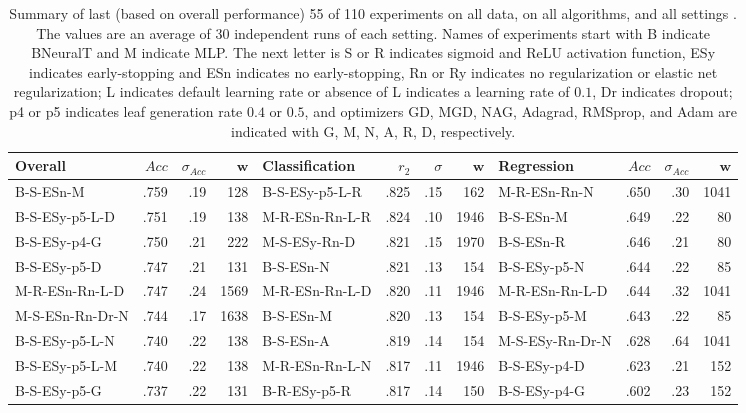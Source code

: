 \documentclass[11pt,a4paper]{article}
\begin{document}
\begin{table}[]
    \tiny
    \centering 
    \renewcommand{\arraystretch}{1.2}
    \setlength{\tabcolsep}{5pt}
    \caption{Summary of last (based on overall performance) 55 of 110 experiments on all data, on all algorithms, and all settings . The values are an average of 30 independent runs of each setting. Names of experiments start with B indicate BNeuralT and M indicate MLP. The next letter is S or R indicates sigmoid and ReLU activation function, ESy indicates early-stopping and ESn indicates no early-stopping, Rn or Ry indicates no regularization or elastic net regularization; L indicates default learning rate or absence of L indicates a learning rate of $0.1$, Dr indicates dropout; p4 or p5 indicates leaf generation rate $0.4$ or $0.5$, and optimizers GD, MGD, NAG, Adagrad, RMSprop, and Adam are  indicated with G, M, N, A, R, D, respectively.
\label{tab:All_experiments_B}}
    \begin{tabular}[t]{lrrrlrrrlrrr}
        \toprule
        Overall & $Acc$ & $\sigma_{Acc}$ & $\textbf{w}$ & Classification & $r_2$ & $\sigma$ & $\textbf{w}$ & Regression & $Acc$ & $\sigma_{Acc}$ & $\textbf{w}$ \\
        \midrule
        B-S-ESn-M & .759 & .19 & 128 & B-S-ESy-p5-L-R & .825 & .15 & 162 & M-R-ESn-Rn-N & .650 & .30 & 1041  \\
        B-S-ESy-p5-L-D & .751 & .19 & 138 & M-R-ESn-Rn-L-R & .824 & .10 & 1946 & B-S-ESn-M & .649 & .22 & 80  \\
        B-S-ESy-p4-G & .750 & .21 & 222 & M-S-ESy-Rn-D & .821 & .15 & 1970 & B-S-ESn-R & .646 & .21 & 80  \\
        B-S-ESy-p5-D & .747 & .21 & 131 & B-S-ESn-N & .821 & .13 & 154 & B-S-ESy-p5-N & .644 & .22 & 85  \\
        M-R-ESn-Rn-L-D & .747 & .24 & 1569 & M-R-ESn-Rn-L-D & .820 & .11 & 1946 & M-R-ESn-Rn-L-D & .644 & .32 & 1041  \\
        M-S-ESn-Rn-Dr-N & .744 & .17 & 1638 & B-S-ESn-M & .820 & .13 & 154 & B-S-ESy-p5-M & .643 & .22 & 85  \\
        B-S-ESy-p5-L-N & .740 & .22 & 138 & B-S-ESn-A & .819 & .14 & 154 & M-S-ESy-Rn-Dr-N & .628 & .64 & 1041  \\
        B-S-ESy-p5-L-M & .740 & .22 & 138 & M-R-ESn-Rn-L-N & .817 & .11 & 1946 & B-S-ESy-p4-D & .623 & .21 & 152  \\
        B-S-ESy-p5-G & .737 & .22 & 131 & B-R-ESy-p5-R & .817 & .14 & 150 & B-S-ESy-p4-G & .602 & .23 & 152  \\

\end{tabular}
\end{table}
\end{document}
